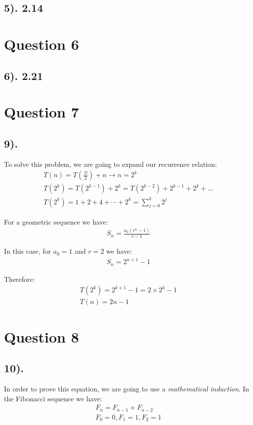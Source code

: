 \documentclass[12pt]{article}
\begin{document}
\subsection*{5). 2.14}

\section*{Question 6}
\subsection*{6). 2.21}

\section*{Question 7}
\subsection*{9).}
To solve this problem, we are going to expand our recurrence relation:
\begin{gather*}
    T(n) = T(\frac{N}{2}) + n \to n = 2^k \\
    T(2^k) = T(2^{k-1}) + 2^k = T(2^{k-2}) + 2^{k-1} + 2^k + \ldots \\
    T(2^k) = 1 + 2 + 4 + \cdots + 2^k = \sum_{j=0}^k 2^j
\end{gather*}

For a geometric sequence we have:
\begin{gather*}
    S_{n} = \frac{a_{0}(r^n-1)}{r-1}
\end{gather*}

In this case, for $a_{0}=1$ and ${r=2}$ we have:
\begin{gather*}
    S_{n} = 2^{n+1} - 1
\end{gather*}

Therefore:
\begin{gather*}
    T(2^k) = 2^{k+1} - 1 = 2 \times 2^k - 1 \\
    T(n) = 2n - 1
\end{gather*}


\section*{Question 8}
\subsection*{10).}
In order to prove this equation, we are going to use a \textit{mathematical induction}. In the Fibonacci sequence we have:
\begin{gather*}
    F_{n} = F_{n-1} + F_{n-2} \\
    F_{0}=0, F_{1}=1, F_{2}=1
\end{gather*}
\end{document}
